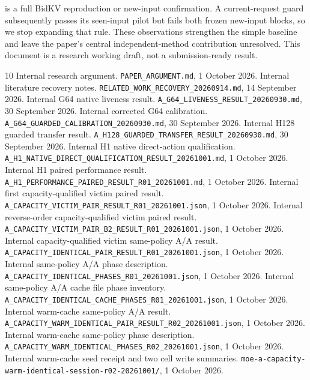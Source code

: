 \documentclass[10pt]{article}
\begin{document}
is a full BidKV reproduction or new-input confirmation. A current-request guard subsequently passes its seen-input pilot but fails both frozen new-input blocks, so we stop expanding that rule. These observations strengthen the simple baseline and leave the paper's central independent-method contribution unresolved. This document is a research working draft, not a submission-ready result.

\begin{thebibliography}{10}
 Internal research argument. \nolinkurl{PAPER_ARGUMENT.md}, 1 October 2026.
 Internal literature recovery notes. \nolinkurl{RELATED_WORK_RECOVERY_20260914.md}, 14 September 2026.
 Internal G64 native liveness result. \nolinkurl{A_G64_LIVENESS_RESULT_20260930.md}, 30 September 2026.
 Internal corrected G64 calibration. \nolinkurl{A_G64_GUARDED_CALIBRATION_20260930.md}, 30 September 2026.
 Internal H128 guarded transfer result. \nolinkurl{A_H128_GUARDED_TRANSFER_RESULT_20260930.md}, 30 September 2026.
 Internal H1 native direct-action qualification. \nolinkurl{A_H1_NATIVE_DIRECT_QUALIFICATION_RESULT_20261001.md}, 1 October 2026.
 Internal H1 paired performance result. \nolinkurl{A_H1_PERFORMANCE_PAIRED_RESULT_R01_20261001.md}, 1 October 2026.
 Internal first capacity-qualified victim paired result. \nolinkurl{A_CAPACITY_VICTIM_PAIR_RESULT_R01_20261001.json}, 1 October 2026.
 Internal reverse-order capacity-qualified victim paired result. \nolinkurl{A_CAPACITY_VICTIM_PAIR_B2_RESULT_R01_20261001.json}, 1 October 2026.
 Internal capacity-qualified victim same-policy A/A result. \nolinkurl{A_CAPACITY_IDENTICAL_PAIR_RESULT_R01_20261001.json}, 1 October 2026.
 Internal same-policy A/A phase description. \nolinkurl{A_CAPACITY_IDENTICAL_PHASES_R01_20261001.json}, 1 October 2026.
 Internal same-policy A/A cache file phase inventory. \nolinkurl{A_CAPACITY_IDENTICAL_CACHE_PHASES_R01_20261001.json}, 1 October 2026.
 Internal warm-cache same-policy A/A result. \nolinkurl{A_CAPACITY_WARM_IDENTICAL_PAIR_RESULT_R02_20261001.json}, 1 October 2026.
 Internal warm-cache same-policy phase description. \nolinkurl{A_CAPACITY_WARM_IDENTICAL_PHASES_R02_20261001.json}, 1 October 2026.
 Internal warm-cache seed receipt and two cell write summaries. \nolinkurl{moe-a-capacity-warm-identical-session-r02-20261001/}, 1 October 2026.

\end{thebibliography}
\end{document}
